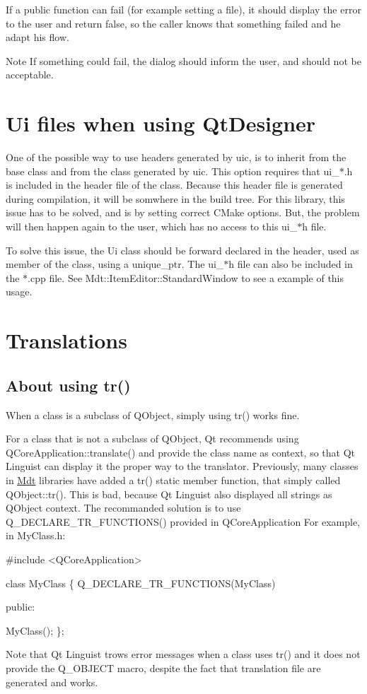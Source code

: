 If a public function can fail (for example setting a file), it should display the error to the user and return false, so the caller knows that something failed and he adapt his flow. \begin{DoxyNote}{Note}
If something could fail, the dialog should inform the user, and should not be acceptable.
\end{DoxyNote}
\hypertarget{guideline_page_ui_files}{}\section{Ui files when using Qt\+Designer}\label{guideline_page_ui_files}
One of the possible way to use headers generated by uic, is to inherit from the base class and from the class generated by uic. This option requires that ui\+\_\+$\ast$.h is included in the header file of the class. Because this header file is generated during compilation, it will be somwhere in the build tree. For this library, this issue has to be solved, and is by setting correct C\+Make options. But, the problem will then happen again to the user, which has no access to this ui\+\_\+$\ast$h file.

To solve this issue, the Ui class should be forward declared in the header, used as member of the class, using a unique\+\_\+ptr. The ui\+\_\+$\ast$h file can also be included in the $\ast$.cpp file. See Mdt\+::\+Item\+Editor\+::\+Standard\+Window to see a example of this usage.\hypertarget{guideline_page_translations}{}\section{Translations}\label{guideline_page_translations}
\hypertarget{guideline_page_translations_tr}{}\subsection{About using tr()}\label{guideline_page_translations_tr}
When a class is a subclass of Q\+Object, simply using tr() works fine.

For a class that is not a subclass of Q\+Object, Qt recommends using Q\+Core\+Application\+::translate() and provide the class name as context, so that Qt Linguist can display it the proper way to the translator. Previously, many classes in \hyperlink{namespace_mdt}{Mdt} libraries have added a tr() static member function, that simply called Q\+Object\+::tr(). This is bad, because Qt Linguist also displayed all strings as Q\+Object context. The recommanded solution is to use Q\+\_\+\+D\+E\+C\+L\+A\+R\+E\+\_\+\+T\+R\+\_\+\+F\+U\+N\+C\+T\+I\+O\+N\+S() provided in Q\+Core\+Application For example, in My\+Class.\+h\+: 
\begin{DoxyCode}
\textcolor{preprocessor}{#include <QCoreApplication>}

\textcolor{keyword}{class }MyClass
\{
  Q\_DECLARE\_TR\_FUNCTIONS(MyClass)

 public:

  MyClass();
\};
\end{DoxyCode}


Note that Qt Linguist trows error messages when a class uses tr() and it does not provide the Q\+\_\+\+O\+B\+J\+E\+CT macro, despite the fact that translation file are generated and works. 